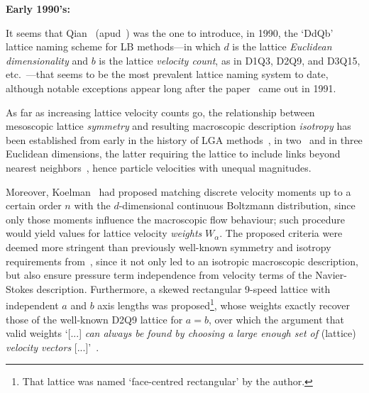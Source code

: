     \vspace{2.0mm}\noindent\textbf{Early 1990's:}\vspace{1.0mm}

    It seems that Qian~\cite{1990-QianYH-Paris} (apud~\cite[p.~235]{1993-QianYH-JSciComput}) was the one to introduce, in  1990,
    the `DdQb' lattice naming scheme for LB methods---in which $d$ is the lattice \emph{Euclidean dimensionality} and $b$ is the
    lattice  \emph{velocity   count},   as   in   D1Q3,   D2Q9,   and   D3Q15,   etc.~\cite{1992-QianYH+LallemandP-EuroPhysLett,
    1993-QianYH+OrszagSA-EuroPhysLett}---that seems to be the most prevalent lattice naming system  to  date,  although  notable
    exceptions appear long after the paper~\cite{1991-QianYH+LallemandP-AdvKinTheoContMech} came out in 1991.

    As far as increasing lattice velocity counts go, the relationship between mesoscopic lattice \emph{symmetry}  and  resulting
    macroscopic   description   \emph{isotropy}   has   been   established    from    early    in    the    history    of    LGA
    methods~\cite{1973-HardyJ+PazzisO-JMathPhys, 1976-HardyJ+PomeauY-PhysRevA},  in  two~\cite{1986-FrischU+PomeauY-PhysRevLett}
    and  in  three  Euclidean   dimensions,   the   latter   requiring   the   lattice   to   include   links   beyond   nearest
    neighbors~\cite[pp.~473, 490]{1986-WolframS-JStatPhys}, hence particle velocities with unequal magnitudes.

    Moreover, Koelman~\cite{1991-KoelmanJMVA-EuroPhysLett} had proposed matching discrete velocity moments up to a certain order
    $n$ with the $d$-dimensional continuous Boltzmann distribution, since only those  moments  influence  the  macroscopic  flow
    behaviour; such procedure would yield values for lattice velocity \emph{weights} $W_{\alpha}$. The  proposed  criteria  were
    deemed more stringent than previously well-known symmetry  and  isotropy  requirements  from~\cite{1986-WolframS-JStatPhys},
    since it not only led to an isotropic macroscopic description, but also ensure  pressure  term  independence  from  velocity
    terms of the Navier-Stokes description. Furthermore, a skewed rectangular 9-speed lattice with independent $a$ and $b$  axis
    lengths was proposed\footnote{That lattice was named `face-centred rectangular'  by  the  author.},  whose  weights  exactly
    recover those of the well-known D2Q9 lattice for $a = b$, over which the argument that valid weights `[...] \emph{can always
    be found by choosing a large enough set of} (lattice) \emph{velocity vectors\/} [...]'~\cite{1991-KoelmanJMVA-EuroPhysLett}.

